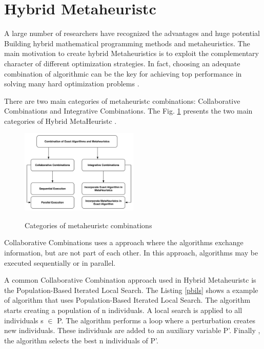 \section{Hybrid Metaheuristc}


A large  number of researchers have recognized the advantages and huge potential Building
hybrid mathematical programming methods and metaheuristics.
The main motivation to create hybrid Metaheuristics is to exploit the complementary character of different optimization strategies. In fact, choosing an adequate combination of algorithmic can be the key for achieving top performance in solving many hard optimization problems \cite{Puchinger2005} \cite{Blum2012}.


There are two main categories of metaheuristc combinations: Collaborative Combinations and Integrative Combinations. The Fig. \ref{fig:metaheuristc} presents the two main categories of Hybrid MetaHeuristc \cite{Puchinger2005}.

\begin{figure}[h]
\caption{Categories of metaheuristc combinations \cite{Puchinger2005} }
\includegraphics[width=0.5\textwidth]{./images/metaheuristcs.png}
\label{fig:metaheuristc}
\end{figure}

Collaborative Combinations uses a approach where the  algorithms exchange information, but are not part of each other. In this approach,  algorithms may be executed sequentially or in parallel.

A common Collaborative Combination approach used in Hybrid Metaheuristc is the Population-Based Iterated Local Search.
The Listing \ref{pbils} shows a example of algorithm that  uses  Population-Based Iterated Local Search.  The algorithm starts  creating a population of n individuals. A local search is applied to all individuals s $\in$ P. The algorithm performs a loop where a perturbation creates new individuals. These individuals are added to an auxiliary variable P'.  Finally , the algorithm selects the best n individuals of P'.

